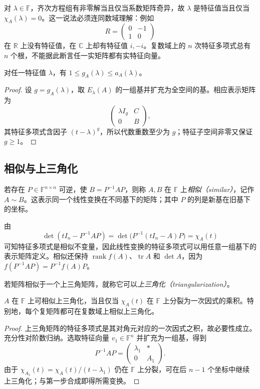 对 $\lambda\in\mathbb F$，齐次方程组有非零解当且仅当系数矩阵奇异，故 $\lambda$ 是特征值当且仅当 $\chi_A(\lambda)=0$。这一说法必须连同数域理解：例如
\[
R=\begin{pmatrix}0&-1\\1&0\end{pmatrix}
\]
在 $\mathbb R$ 上没有特征值，在 $\mathbb C$ 上却有特征值 $i,-i$。复数域上的 $n$ 次特征多项式总有 $n$ 个根，不能据此断言任一实矩阵都有实特征向量。

\begin{proposition}
\label{prop:xie-ex-eig-geometric-algebraic}
对任一特征值 $\lambda$，有 $1\le g_A(\lambda)\le a_A(\lambda)$。
\end{proposition}
\begin{proof}
设 $g=g_A(\lambda)$，取 $E_\lambda(A)$ 的一组基并扩充为全空间的基。相应表示矩阵为
\[
\begin{pmatrix}\lambda I_g&C\\0&B\end{pmatrix},
\]
其特征多项式含因子 $(t-\lambda)^g$，所以代数重数至少为 $g$；特征子空间非零又保证 $g\ge1$。
\end{proof}

\subsection{相似与上三角化}

\begin{definition}
若存在 $P\in\mathbb F^{n\times n}$ 可逆，使 $B=P^{-1}AP$，则称 $A,B$ 在 $\mathbb F$ 上\emph{相似（similar）}，记作 $A\sim B$。这表示同一个线性变换在不同基下的矩阵；其中 $P$ 的列是新基在旧基下的坐标。
\end{definition}

由
\[
\det(tI_n-P^{-1}AP)=\det\bigl(P^{-1}(tI_n-A)P\bigr)=\chi_A(t)
\]
可知特征多项式是相似不变量，因此线性变换的特征多项式可以用任意一组基下的表示矩阵定义。相似还保持 $\operatorname{rank}f(A)$、$\operatorname{tr}A$ 和 $\det A$，因为 $f(P^{-1}AP)=P^{-1}f(A)P$。

若矩阵相似于一个上三角矩阵，就称它可以\emph{上三角化（triangularization）}。

\begin{theorem}
\label{thm:xie-ex-eig-triangularization}
$A$ 在 $\mathbb F$ 上可相似上三角化，当且仅当 $\chi_A(t)$ 在 $\mathbb F$ 上分裂为一次因式的乘积。特别地，每个复矩阵都可在复数域上相似上三角化。
\end{theorem}
\begin{proof}
上三角矩阵的特征多项式是其对角元对应的一次因式之积，故必要性成立。充分性对阶数归纳。选取特征向量 $v_1\in\mathbb F^n$ 并扩充为一组基，得到
\[
P^{-1}AP=\begin{pmatrix}\lambda_1&*\\0&A_1\end{pmatrix}.
\]
由于 $\chi_{A_1}(t)=\chi_A(t)/(t-\lambda_1)$ 仍在 $\mathbb F$ 上分裂，可在后 $n-1$ 个坐标中继续上三角化；与第一步合成即得所需变换。
\end{proof}

